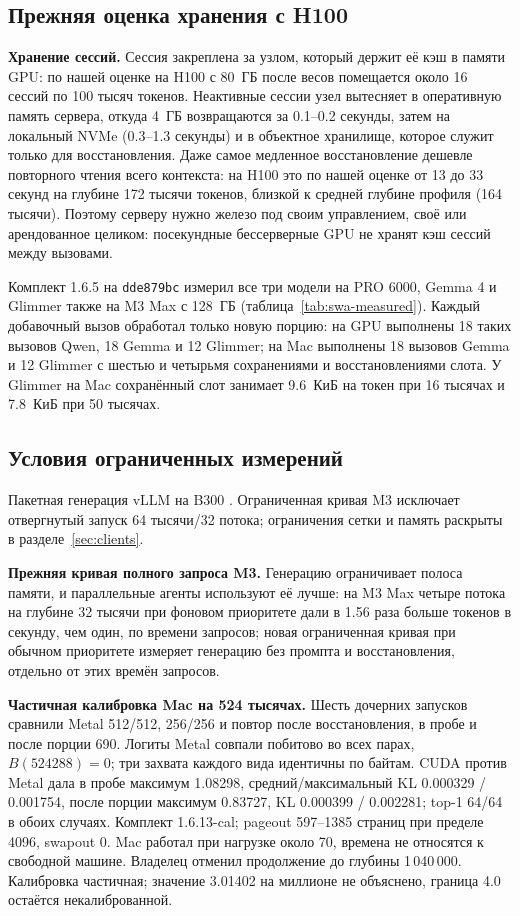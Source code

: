 \subsection{Прежняя оценка хранения с H100}
\label{app:storage-model-history}

\textbf{Хранение сессий.} Сессия закреплена за узлом, который держит её кэш в памяти GPU: по нашей оценке на H100 с 80~ГБ после весов
помещается около 16 сессий по 100 тысяч токенов. Неактивные сессии узел вытесняет в оперативную память
сервера, откуда 4~ГБ возвращаются за 0.1--0.2 секунды, затем на локальный NVMe (0.3--1.3 секунды) и в объектное
хранилище, которое служит только для восстановления. Даже самое медленное восстановление дешевле повторного
чтения всего контекста: на H100 это по нашей оценке от 13 до 33 секунд на глубине 172 тысячи токенов, близкой к средней глубине профиля (164 тысячи). Поэтому серверу нужно железо под своим
управлением, своё или арендованное целиком: посекундные бессерверные GPU не хранят кэш сессий между вызовами.

Комплект 1.6.5 на \texttt{dde879bc} измерил все три модели на PRO 6000, Gemma 4 и Glimmer
также на M3 Max с 128~ГБ (таблица~\ref{tab:swa-measured}). Каждый добавочный вызов обработал
только новую порцию: на GPU выполнены 18 таких вызовов Qwen, 18 Gemma и 12 Glimmer;
на Mac выполнены 18 вызовов Gemma и 12 Glimmer с шестью и четырьмя сохранениями и восстановлениями слота.
У Glimmer на Mac сохранённый слот занимает 9.6~КиБ на токен при 16 тысячах и 7.8~КиБ при 50 тысячах.

\subsection{Условия ограниченных измерений}
Пакетная генерация vLLM на B300 .
Ограниченная кривая M3 исключает отвергнутый запуск 64 тысячи/32 потока;
ограничения сетки и память раскрыты в разделе~\ref{sec:clients}.

\textbf{Прежняя кривая полного запроса M3.} Генерацию ограничивает полоса памяти, и
параллельные агенты используют её лучше: на M3 Max четыре потока на глубине 32 тысячи при фоновом приоритете дали в 1.56 раза больше токенов в секунду, чем один, по времени запросов; новая ограниченная кривая при обычном приоритете измеряет генерацию без промпта и восстановления, отдельно от этих времён запросов.

\textbf{Частичная калибровка Mac на 524 тысячах.} Шесть дочерних запусков сравнили Metal 512/512,
256/256 и повтор после восстановления, в пробе и после порции 690.
Логиты Metal совпали побитово во всех парах, $B(524288)=0$;
три захвата каждого вида идентичны по байтам.
CUDA против Metal дала в пробе максимум 1.08298, средний/максимальный KL 0.000329 / 0.001754,
после порции максимум 0.83727, KL 0.000399 / 0.002281; top-1 64/64 в обоих случаях.
Комплект 1.6.13-cal; pageout 597--1385 страниц при пределе 4096, swapout 0.
Mac работал при нагрузке около 70, времена не относятся к свободной машине.
Владелец отменил продолжение до глубины 1\,040\,000. Калибровка частичная;
значение 3.01402 на миллионе не объяснено, граница 4.0 остаётся некалиброванной.

